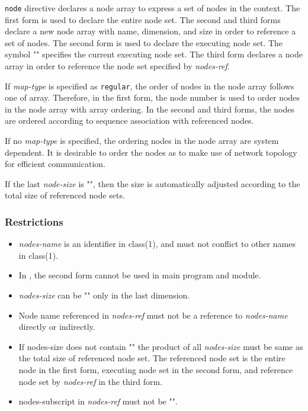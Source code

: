{\tt node} directive declares a node array to express a
set of nodes in the context. The first form is used to declare the
entire node set. The second and third forms declare a new node array
with name, dimension, and size in order to reference a set of
nodes. The second form is used to declare the executing node set. The
symbol "{\tt *}" specifies the current executing node set. The third form
declares a node array in order to reference the node set specified by
{\it nodes-ref}.  

If {\it map-type} is specified as {\tt regular}, the order of nodes in
the node array follows one of \Fort array. Therefore, in the first
form, the node number is used to order nodes in the node array with
\Fort array ordering. In the second and third forms, the nodes are
ordered according to sequence association with referenced nodes.  

If no {\it map-type} is specified, the ordering nodes in the node array are
system dependent. It is desirable to order the nodes as to make use of
network topology for efficient communication. 

If the last {\it node-size} is
"{\tt *}", then the size is automatically adjusted according to the total
size of referenced node sets.

\subsubsection*{Restrictions}

\begin{itemize}
\item {\it nodes-name} is an identifier in class(1), and must not
  conflict to other names in class(1).
\item In \Fort, the second form cannot be used in main program
and module.
\item {\it nodes-size} can be "{\tt *}" only in the last dimension.
\item Node name referenced in {\it nodes-ref} must not be a reference to
{\it nodes-name} directly or indirectly. 
\item If nodes-size does not contain "{\tt *}"
the product of all {\it nodes-size} must be same as the total size of
referenced node set. The referenced node set is the entire node in the
first form, executing node set in the second form, and reference node
set by {\it nodes-ref} in the third form.
\item nodes-subscript in {\it nodes-ref} must not be "{\tt *}".
\end{itemize}

